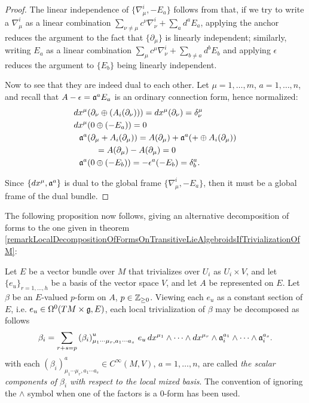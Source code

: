 \begin{proof}
The linear independence of $\{\nabla^i_\mu, -E_a\}$ follows from that, if we try to write a $\nabla^i_\mu$ as a linear combination $\sum_{\nu \neq \mu} c^\nu \nabla^i_\nu + \sum_a d^a E_a$, applying the anchor reduces the argument to the fact that $\{\partial_\mu\}$ is linearly independent; similarly, writing $E_a$ as a linear combination $\sum_{\mu} c^\mu \nabla^i_\nu + \sum_{b \neq a} d^b E_b$ and applying $\epsilon$ reduces the argument to $\{E_b\}$ being linearly independent.

Now to see that they are indeed dual to each other. Let $\mu = 1, \dots, m$, $a = 1, \dots, n$, and recall that $A - \epsilon = \alg a^a E_a$ is an ordinary connection form, hence normalized:
\begin{align*}
    dx^\mu&(\partial_\nu \oplus( A_i(\partial_\nu))) = dx^\mu(\partial_\nu) = \delta^\mu_\nu\\
    dx^\mu&(0 \oplus (-E_a)) = 0\\
    \alg a^a&(\partial_\mu + A_i(\partial_\mu)) = A(\partial_\mu) + \alg a^a(+\oplus A_i(\partial_\mu)) \\
    &\quad = A(\partial_\mu) - A(\partial_\mu) = 0\\
    \alg a^a&(0\oplus (-E_b)) = -\epsilon^a(-E_b) = \delta^a_b.
\end{align*}

Since $\{dx^\mu, \mathfrak{a}^a\}$ is dual to the global frame $\{\nabla^i_\mu, -E_a\}$, then it must be a global frame of the dual bundle.
\end{proof}

The following proposition now follows, giving an alternative decomposition of forms to the one given in theorem \ref{remarkLocalDecompositionOfFormsOnTransitiveLieAlgebroidsIfTrivializationOfM}:

\begin{proposition}\label{TheoremDecompOfVectorValuedFormsTLAMixedLocalBasisDxs}
Let $E$ be a vector bundle over $M$ that trivializes over $U_i$ as $U_i \times V$, and let $\{e_u\}_{r = 1, \dots, h}$ be a basis of the vector space $V$, and let $A$ be represented on $E$. Let $\beta$ be an $E$-valued $p$-form on $A$, $p \in \mathbb{Z}_{\geq 0}$. Viewing each $e_u$ as a constant section of $E$, i.e. $e_u \in \Omega^0(TM \times \mathfrak{g}, E)$, each local trivialization of $\beta$ may be decomposed as follows
\begin{equation}
    \beta_i = \sum_{r + s = p} \left(\beta_i \right)^u_{\mu_1 \cdots \mu_r, a_1 \cdots a_s}\, e_u \, dx^{\mu_1} \wedge \cdots \wedge dx^{\mu_r} \wedge \mathfrak{a}_i^{a_1} \wedge \cdots \wedge \mathfrak{a}_i^{a_s}.
\end{equation} 
with each $\left(\beta_i\right)^a_{\mu_1 \cdots \mu_r, a_1 \cdots a_s} \in C^\infty(M, V)$, $a = 1, \dots, n$, are called \emph{the scalar components of $\beta_i$ with respect to the local mixed basis}.
The convention of ignoring the $\wedge$ symbol when one of the factors is a $0$-form has been used.
\end{proposition}

